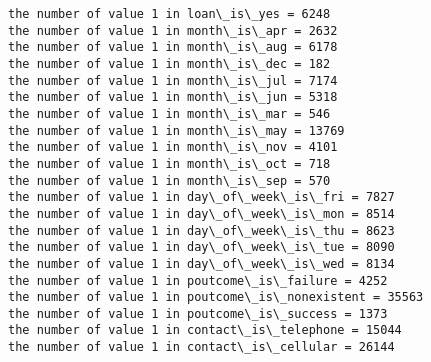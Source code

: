 \documentclass[11pt]{article}
\begin{document}
\begin{Verbatim}[commandchars=\\\{\}]
the number of value 1 in loan\_is\_yes = 6248
the number of value 1 in month\_is\_apr = 2632
the number of value 1 in month\_is\_aug = 6178
the number of value 1 in month\_is\_dec = 182
the number of value 1 in month\_is\_jul = 7174
the number of value 1 in month\_is\_jun = 5318
the number of value 1 in month\_is\_mar = 546
the number of value 1 in month\_is\_may = 13769
the number of value 1 in month\_is\_nov = 4101
the number of value 1 in month\_is\_oct = 718
the number of value 1 in month\_is\_sep = 570
the number of value 1 in day\_of\_week\_is\_fri = 7827
the number of value 1 in day\_of\_week\_is\_mon = 8514
the number of value 1 in day\_of\_week\_is\_thu = 8623
the number of value 1 in day\_of\_week\_is\_tue = 8090
the number of value 1 in day\_of\_week\_is\_wed = 8134
the number of value 1 in poutcome\_is\_failure = 4252
the number of value 1 in poutcome\_is\_nonexistent = 35563
the number of value 1 in poutcome\_is\_success = 1373
the number of value 1 in contact\_is\_telephone = 15044
the number of value 1 in contact\_is\_cellular = 26144

    \end{Verbatim}


    
    
    
    
\end{document}
